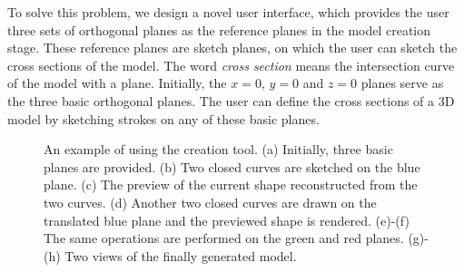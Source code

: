 To solve this problem, we design a novel user interface, which provides the user three sets of orthogonal planes as the reference planes in the model creation stage. These reference planes are sketch planes, on which the user can sketch the cross sections of the model. The word \emph{cross section} means the intersection curve of the model with a plane. Initially, the $x=0$, $y=0$ and $z=0$ planes serve as the three basic orthogonal planes. The user can define the cross sections of a 3D model by sketching strokes on any of these basic planes.

\begin{figure} [htbp]
  \centering
  \caption{An example of using the creation tool. (a) Initially, three basic planes are provided. (b) Two closed curves are sketched on the blue plane. (c) The preview of the current shape reconstructed from the two curves. (d) Another two closed curves are drawn on the translated blue plane and the previewed shape is rendered. (e)-(f) The same operations are performed on the green and red planes. (g)-(h) Two views of the finally generated model.}
  \label{fig:uicreationEG} %
\end{figure}

